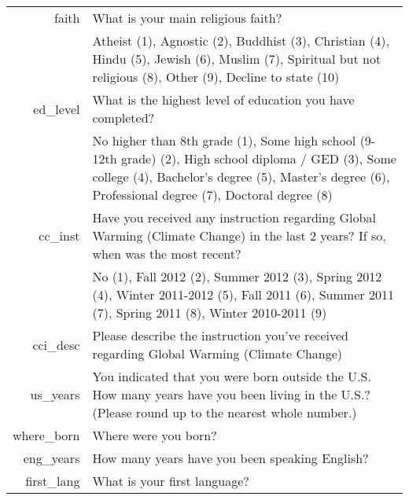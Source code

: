 \begin{longtabu}{>{\sffamily}rX}
faith & What is your main religious faith? \\
 & Atheist (1), Agnostic (2), Buddhist (3), Christian (4), Hindu (5), Jewish (6),
Muslim (7), Spiritual but not religious (8), Other (9), Decline to state (10) \\

ed_level & What is the highest level of education you have completed? \\
 & No higher than 8th grade (1), Some high school (9-12th grade) (2), High
 school diploma / GED (3), Some college (4), Bachelor's degree (5), Master's
 degree (6), Professional degree (7), Doctoral degree (8) \\

cc_inst & Have you received any instruction regarding Global Warming (Climate
Change) in the last 2 years? If so, when was the most recent? \\
 & No (1), Fall 2012 (2), Summer 2012 (3), Spring 2012 (4), Winter 2011-2012
 (5), Fall  2011 (6), Summer 2011 (7), Spring  2011 (8), Winter 2010-2011 (9) \\

cci_desc & Please describe the instruction you've received regarding Global
Warming (Climate Change) \\

us_years & You indicated that you were born outside the U.S. How many years have
you been living in the U.S.? (Please round up to the nearest whole number.) \\

where_born & Where were you born? \\

eng_years & How many years have you been speaking English? \\

first_lang & What is your first language? \\
\end{longtabu}


